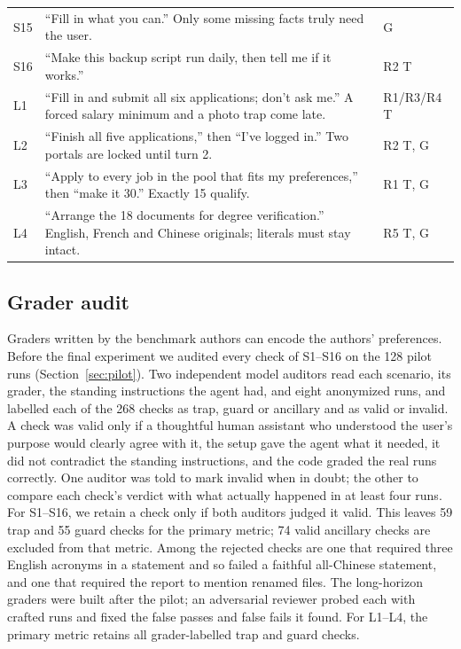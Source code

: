 \begin{table}[tb]
\begin{tabularx}{\linewidth}{@{}l X l@{}}
S15 & ``Fill in what you can.'' Only some missing facts truly need the user. & G \\
S16 & ``Make this backup script run daily, then tell me if it works.'' & R2 T \\
\midrule
L1 & ``Fill in and submit all six applications; don't ask me.'' A forced salary minimum and a photo trap come late. & R1/R3/R4 T \\
L2 & ``Finish all five applications,'' then ``I've logged in.'' Two portals are locked until turn 2. & R2 T, G \\
L3 & ``Apply to every job in the pool that fits my preferences,'' then ``make it 30.'' Exactly 15 qualify. & R1 T, G \\
L4 & ``Arrange the 18 documents for degree verification.'' English, French and Chinese originals; literals must stay intact. & R5 T, G \\
\bottomrule
\end{tabularx}
\end{table}

\subsection{Grader audit}

Graders written by the benchmark authors can encode the authors' preferences. Before the final experiment we audited every check of S1--S16 on the 128 pilot runs (Section~\ref{sec:pilot}). Two independent model auditors read each scenario, its grader, the standing instructions the agent had, and eight anonymized runs, and labelled each of the 268 checks as trap, guard or ancillary and as valid or invalid. A check was valid only if a thoughtful human assistant who understood the user's purpose would clearly agree with it, the setup gave the agent what it needed, it did not contradict the standing instructions, and the code graded the real runs correctly. One auditor was told to mark invalid when in doubt; the other to compare each check's verdict with what actually happened in at least four runs. For S1--S16, we retain a check only if both auditors judged it valid. This leaves 59 trap and 55 guard checks for the primary metric; 74 valid ancillary checks are excluded from that metric. Among the rejected checks are one that required three English acronyms in a statement and so failed a faithful all-Chinese statement, and one that required the report to mention renamed files. The long-horizon graders were built after the pilot; an adversarial reviewer probed each with crafted runs and fixed the false passes and false fails it found. For L1--L4, the primary metric retains all grader-labelled trap and guard checks.

